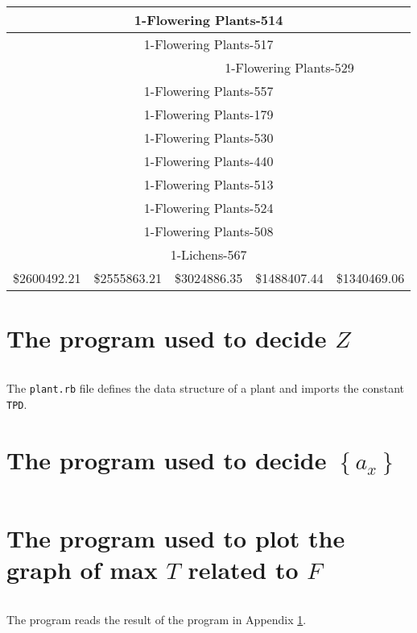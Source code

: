 \documentclass{article}
\begin{document}
\begin{table}[h!]
\begin{tabular}{|p{1.8cm}|p{1.8cm}|p{1.8cm}|p{1.8cm}|p{1.8cm}|}
\multicolumn{5}{|c|}{1-Flowering Plants-514}\\\hline
\multicolumn{5}{|c|}{1-Flowering Plants-517}\\\hline
& & \multicolumn{3}{c|}{1-Flowering Plants-529}\\\hline
\multicolumn{5}{|c|}{1-Flowering Plants-557}\\\hline
\multicolumn{5}{|c|}{1-Flowering Plants-179}\\\hline
\multicolumn{5}{|c|}{1-Flowering Plants-530}\\\hline
\multicolumn{5}{|c|}{1-Flowering Plants-440}\\\hline
\multicolumn{5}{|c|}{1-Flowering Plants-513}\\\hline
\multicolumn{5}{|c|}{1-Flowering Plants-524}\\\hline
\multicolumn{5}{|c|}{1-Flowering Plants-508}\\\hline
\multicolumn{5}{|c|}{1-Lichens-567}\\\hline
\hline
\$2600492.21 & \$2555863.21 & \$3024886.35 & \$1488407.44 & \$1340469.06\\
\hline
\end{tabular}
\end{table}

\newpage

\appendix

\section{The program used to decide $Z$}
\label{appendix:prog min T}

\inputminted{ruby}{../knappack.rb}

The \texttt{plant.rb} file defines the data structure of a plant and imports the constant \texttt{TPD}.

\section{The program used to decide $\left\{a_x\right\}$}

\inputminted{ruby}{../min_variance.rb}

\section{The program used to plot the graph of max $T$ related to $F$}

\inputminted{python}{../plot.py}

The program reads the result of the program in Appendix \ref{appendix:prog min T}.
\end{document}
